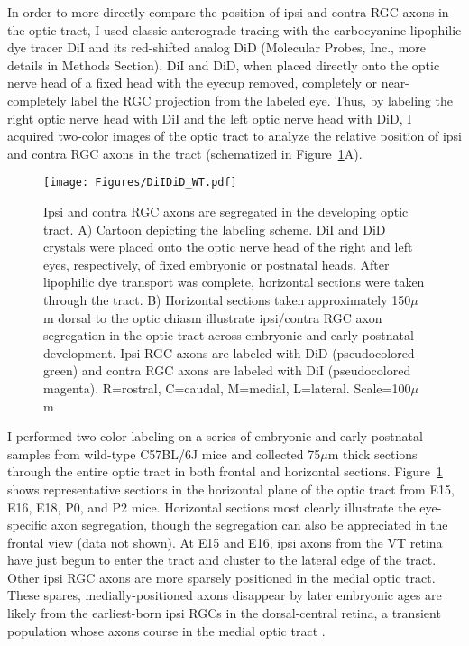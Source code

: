 In order to more directly compare the position of ipsi and contra RGC axons in the optic tract, I used classic anterograde tracing with the carbocyanine lipophilic dye tracer DiI and its red-shifted analog DiD (Molecular Probes, Inc., more details in Methods Section).
DiI and DiD, when placed directly onto the optic nerve head of a fixed head with the eyecup removed, completely or near-completely label the RGC projection from the labeled eye.
Thus, by labeling the right optic nerve head with DiI and the left optic nerve head with DiD, I acquired two-color images of the optic tract to analyze the relative position of ipsi and contra RGC axons in the tract (schematized in Figure~\ref{Figures/DiIDiDWT}A).

\begin{figure}[hbtp]
    \begin{center}
        \texttt{[image: Figures/DiIDiD\_WT.pdf]}
        \caption[Ipsi and contra RGC axons are segregated in the developing optic tract.]
        {Ipsi and contra RGC axons are segregated in the developing optic tract.
        A) Cartoon depicting the labeling scheme.
        DiI and DiD crystals were placed onto the optic nerve head of the right and left eyes, respectively, of fixed embryonic or postnatal heads.
        After lipophilic dye transport was complete, horizontal sections were taken through the tract.
        B) Horizontal sections taken approximately 150$\mu$m dorsal to the optic chiasm illustrate ipsi/contra RGC axon segregation in the optic tract across embryonic and early postnatal development.
        Ipsi RGC axons are labeled with DiD (pseudocolored green) and contra RGC axons are labeled with DiI (pseudocolored magenta).
        R=rostral, C=caudal, M=medial, L=lateral.
		Scale=100$\mu$m}
        \label{Figures/DiIDiDWT}
    \end{center}
\end{figure}

I performed two-color labeling on a series of embryonic and early postnatal samples from wild-type C57BL/6J mice and collected 75$\mu$m thick sections through the entire optic tract in both frontal and horizontal sections.
Figure~\ref{Figures/DiIDiDWT} shows representative sections in the horizontal plane of the optic tract from E15, E16, E18, P0, and P2 mice.
Horizontal sections most clearly illustrate the eye-specific axon segregation, though the segregation can also be appreciated in the frontal view (data not shown). %
At E15 and E16, ipsi axons from the VT retina have just begun to enter the tract and cluster to the lateral edge of the tract.
Other ipsi RGC axons are more sparsely positioned in the medial optic tract.
These spares, medially-positioned axons disappear by later embryonic ages are likely from the earliest-born ipsi RGCs in the dorsal-central retina, a transient population \cite{drager1985birth} whose axons course in the medial optic tract \cite{soares2015transient}.

